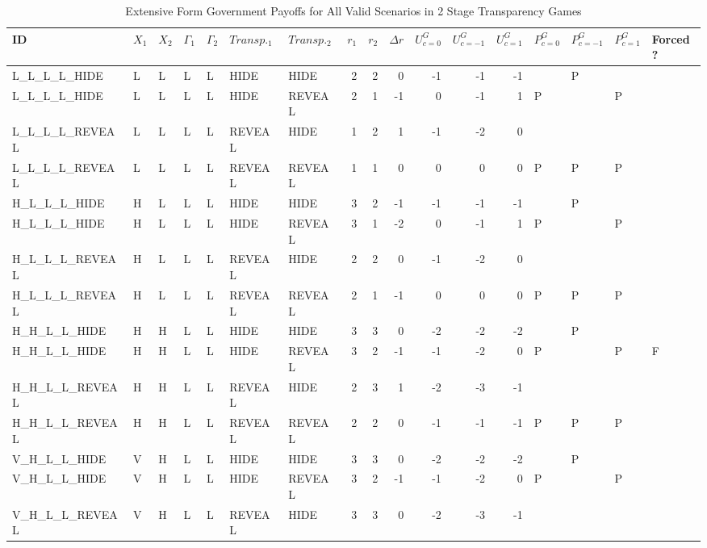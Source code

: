\begingroup\tiny
\begin{longtable}{lllllllrrrrrrllll}
\caption{Extensive Form Government Payoffs for All Valid Scenarios in 2 Stage Transparency Games} \\ 
  \hline
ID & $X_{1}$ & $X_{2}$ & $\Gamma_{1}$ & $\Gamma_{2}$ & $Transp._{1}$ & $Transp._{2}$ & $r_{1}$ & $r_{2}$ & $\Delta r$ & $U^{G}_{c = 0}$ & $U^{G}_{c = -1}$ & $U^{G}_{c = 1}$ & $P^{G}_{c=0}$ & $P^{G}_{c = -1}$ & $P^{G}_{c = 1}$ & Forced? \\ 
  \hline
L\_L\_L\_L\_HIDE & L & L & L & L & HIDE & HIDE & 2 & 2 & 0 & -1 & -1 & -1 &  & P &  &  \\ 
  L\_L\_L\_L\_HIDE & L & L & L & L & HIDE & REVEAL & 2 & 1 & -1 & 0 & -1 & 1 & P &  & P &  \\ 
  L\_L\_L\_L\_REVEAL & L & L & L & L & REVEAL & HIDE & 1 & 2 & 1 & -1 & -2 & 0 &  &  &  &  \\ 
  L\_L\_L\_L\_REVEAL & L & L & L & L & REVEAL & REVEAL & 1 & 1 & 0 & 0 & 0 & 0 & P & P & P &  \\ 
  H\_L\_L\_L\_HIDE & H & L & L & L & HIDE & HIDE & 3 & 2 & -1 & -1 & -1 & -1 &  & P &  &  \\ 
  H\_L\_L\_L\_HIDE & H & L & L & L & HIDE & REVEAL & 3 & 1 & -2 & 0 & -1 & 1 & P &  & P &  \\ 
  H\_L\_L\_L\_REVEAL & H & L & L & L & REVEAL & HIDE & 2 & 2 & 0 & -1 & -2 & 0 &  &  &  &  \\ 
  H\_L\_L\_L\_REVEAL & H & L & L & L & REVEAL & REVEAL & 2 & 1 & -1 & 0 & 0 & 0 & P & P & P &  \\ 
  H\_H\_L\_L\_HIDE & H & H & L & L & HIDE & HIDE & 3 & 3 & 0 & -2 & -2 & -2 &  & P &  &  \\ 
  H\_H\_L\_L\_HIDE & H & H & L & L & HIDE & REVEAL & 3 & 2 & -1 & -1 & -2 & 0 & P &  & P & F \\ 
  H\_H\_L\_L\_REVEAL & H & H & L & L & REVEAL & HIDE & 2 & 3 & 1 & -2 & -3 & -1 &  &  &  &  \\ 
  H\_H\_L\_L\_REVEAL & H & H & L & L & REVEAL & REVEAL & 2 & 2 & 0 & -1 & -1 & -1 & P & P & P &  \\ 
  V\_H\_L\_L\_HIDE & V & H & L & L & HIDE & HIDE & 3 & 3 & 0 & -2 & -2 & -2 &  & P &  &  \\ 
  V\_H\_L\_L\_HIDE & V & H & L & L & HIDE & REVEAL & 3 & 2 & -1 & -1 & -2 & 0 & P &  & P &  \\ 
  V\_H\_L\_L\_REVEAL & V & H & L & L & REVEAL & HIDE & 3 & 3 & 0 & -2 & -3 & -1 &  &  &  &  \\ 

\end{longtable}
